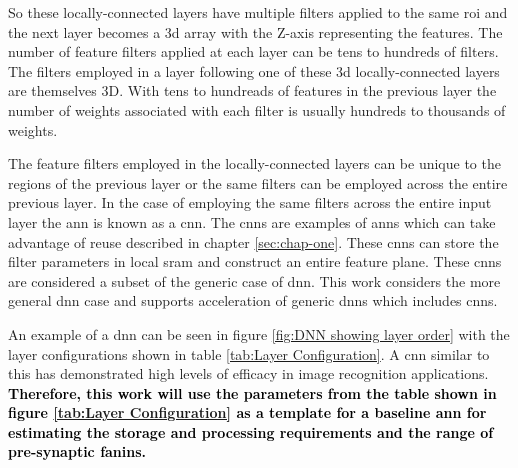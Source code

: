 
So these locally-connected layers have multiple filters applied to the same \ac{roi} and the next layer becomes a \ac{3d} array with the Z-axis representing the features. 
The number of feature filters applied at each layer can be tens to hundreds of filters.
The filters employed in a layer following one of these \ac{3d} locally-connected layers are themselves 3D. With tens to hundreads of features in the previous layer the number of weights associated with each filter is usually hundreds to thousands of weights. 

The feature filters employed in the locally-connected layers can be unique to the regions of the previous layer or the same filters can be employed across the entire previous layer.
In the case of employing the same filters across the entire input layer the \ac{ann} is known as a \acf{cnn}. The \acp{cnn} are examples of \acp{ann} which can take advantage of reuse described in chapter \ref{sec:chap-one}. 
These \acp{cnn} can store the filter parameters in local \ac{sram} and construct an entire feature plane. These \acp{cnn} are considered a subset of the generic case of \ac{dnn}.
This work considers the more general \ac{dnn} case and supports acceleration of generic \acp{dnn} which includes \acp{cnn}.

An example of a \ac{dnn} can be seen in figure \ref{fig:DNN showing layer order} with the layer configurations shown in table \ref{tab:Layer Configuration}. A \ac{cnn} similar to this has demonstrated high levels of efficacy in image recognition applications.
{\textbf{\textcolor{black}{Therefore, this work will use the parameters from the table shown in figure \ref{tab:Layer Configuration} as a template for a baseline \ac{ann} for estimating the storage and processing requirements and the range of pre-synaptic fanins.}}}

